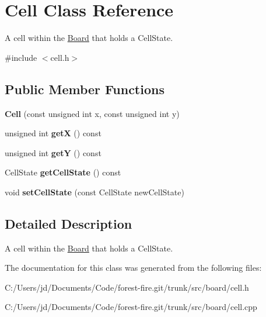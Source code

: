 \hypertarget{class_cell}{}\section{Cell Class Reference}
\label{class_cell}


A cell within the \hyperlink{class_board}{Board} that holds a Cell\+State.  




{\ttfamily \#include $<$cell.\+h$>$}

\subsection*{Public Member Functions}
\begin{DoxyCompactItemize}
\item 
{\bfseries Cell} (const unsigned int x, const unsigned int y)\hypertarget{class_cell_a595ac477f5ff12eeffa423c5f2d55e81}{}\label{class_cell_a595ac477f5ff12eeffa423c5f2d55e81}

\item 
unsigned int {\bfseries getX} () const \hypertarget{class_cell_aa986a7445f2e71a7c46e232435555e43}{}\label{class_cell_aa986a7445f2e71a7c46e232435555e43}

\item 
unsigned int {\bfseries getY} () const \hypertarget{class_cell_a0b95247e834719b1e67a01fb1494f1bc}{}\label{class_cell_a0b95247e834719b1e67a01fb1494f1bc}

\item 
Cell\+State {\bfseries get\+Cell\+State} () const \hypertarget{class_cell_a915474879b5063a8b635078fa0ae6e98}{}\label{class_cell_a915474879b5063a8b635078fa0ae6e98}

\item 
void {\bfseries set\+Cell\+State} (const Cell\+State new\+Cell\+State)\hypertarget{class_cell_a0c15d367b3df1ef26b08340693c741d1}{}\label{class_cell_a0c15d367b3df1ef26b08340693c741d1}

\end{DoxyCompactItemize}


\subsection{Detailed Description}
A cell within the \hyperlink{class_board}{Board} that holds a Cell\+State. 

The documentation for this class was generated from the following files\+:\begin{DoxyCompactItemize}
\item 
C\+:/\+Users/jd/\+Documents/\+Code/forest-\/fire.\+git/trunk/src/board/cell.\+h\item 
C\+:/\+Users/jd/\+Documents/\+Code/forest-\/fire.\+git/trunk/src/board/cell.\+cpp\end{DoxyCompactItemize}
